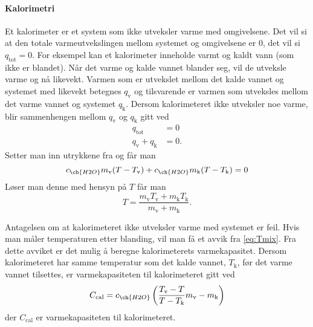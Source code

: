 	\paragraph{Kalorimetri}
	Et kalorimeter er et system som ikke utveksler varme med omgivelsene.
	Det vil si at den totale varmeutvekslingen mellom systemet og omgivelsene er $0$, det vil si $q_\mathrm{tot}=0$.
	For eksempel kan et kalorimeter inneholde varmt og kaldt vann (som ikke er blandet).
	Når det varme og kalde vannet blander seg, vil de utveksle varme og nå likevekt.
	Varmen som er utvekslet mellom det kalde vannet og systemet med likevekt betegnes $q_\mathrm{v}$ og tilsvarende er varmen som utveksles mellom det varme vannet og systemet $q_\mathrm{k}$.
	Dersom kalorimeteret ikke utveksler noe varme, blir sammenhengen mellom $q_\mathrm{v}$ og $q_\mathrm{k}$ gitt ved
	\begin{align*}
		q_\mathrm{tot} &= 0 \\
		q_\mathrm{v} + q_\mathrm{k} &= 0.
	\end{align*}
	Setter man inn utrykkene fra  og  får man
	\begin{equation*}
		c_{\ch{H2O}}m_\mathrm{v}(T-T_\mathrm{v}) + c_{\ch{H2O}}m_\mathrm{k}(T-T_\mathrm{k}) = 0
	\end{equation*}
		Løser man denne med hensyn på $T$ får man
	\begin{equation}
		T = \frac{m_\mathrm{v}T_\mathrm{v} + m_\mathrm{k}T_\mathrm{k}}{m_\mathrm{v} + m_\mathrm{k}}. \label{eq:Tmix}
	\end{equation}

	Antagelsen om at kalorimeteret ikke utveksler varme med systemet er feil.
	Hvis man måler temperaturen etter blanding, vil man få et avvik fra \cref{eq:Tmix}.
	Fra dette avviket er det mulig å beregne kalorimeterets varmekapasitet.
	Dersom kalorimeteret har samme temperatur som det kalde vannet, $T_\mathrm{k}$, før det varme vannet tilsettes, er varmekapasiteten til kalorimeteret gitt ved
	\begin{equation}
		C_{\mathrm{cal}} = c_{\ch{H2O}}\left(\frac{T_\mathrm{v}-T}{T-T_\mathrm{k}}m_\mathrm{v}-m_\mathrm{k}\right) \label{eq:cal}
	\end{equation}
	der $C_{\mathrm{cal}}$ er varmekapasiteten til kalorimeteret.
	
